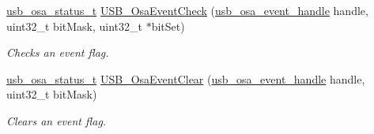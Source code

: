 \begin{DoxyCompactItemize}
\hyperlink{group__usb__os__abstraction_ga8de2fb7579de0a6621bbc1776519b0a9}{usb\-\_\-osa\-\_\-status\-\_\-t} \hyperlink{group__usb__os__abstraction_gab25fb5d93d3b665ca8eadf2a670d3361}{U\-S\-B\-\_\-\-Osa\-Event\-Check} (\hyperlink{group__usb__os__abstraction_gaa5faa1787d0c772a2cf101b3eaf654f6}{usb\-\_\-osa\-\_\-event\-\_\-handle} handle, uint32\-\_\-t bit\-Mask, uint32\-\_\-t $\ast$bit\-Set)
\begin{DoxyCompactList}\small\item\em Checks an event flag. \end{DoxyCompactList}\item 
\hyperlink{group__usb__os__abstraction_ga8de2fb7579de0a6621bbc1776519b0a9}{usb\-\_\-osa\-\_\-status\-\_\-t} \hyperlink{group__usb__os__abstraction_ga90357f04d40469dc07104033b3c8581c}{U\-S\-B\-\_\-\-Osa\-Event\-Clear} (\hyperlink{group__usb__os__abstraction_gaa5faa1787d0c772a2cf101b3eaf654f6}{usb\-\_\-osa\-\_\-event\-\_\-handle} handle, uint32\-\_\-t bit\-Mask)
\begin{DoxyCompactList}\small\item\em Clears an event flag. \end{DoxyCompactList}\end{DoxyCompactItemize}
